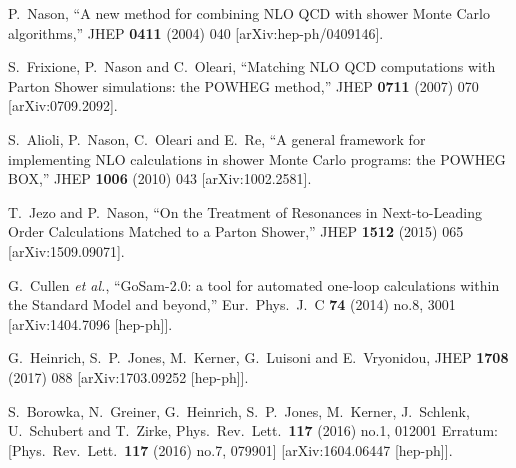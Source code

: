 \documentclass[paper]{JHEP3}
\begin{document}
\begin{thebibliography}{10}

  P.~Nason,
  ``A new method for combining NLO QCD with shower Monte Carlo algorithms,''
  JHEP {\bf 0411} (2004) 040
  [arXiv:hep-ph/0409146].

  S.~Frixione, P.~Nason and C.~Oleari,
  ``Matching NLO QCD computations with Parton Shower simulations: the POWHEG method,''
  JHEP {\bf 0711} (2007) 070
  [arXiv:0709.2092].

  S.~Alioli, P.~Nason, C.~Oleari and E.~Re,
  ``A general framework for implementing NLO calculations in shower Monte Carlo programs: the POWHEG BOX,''
  JHEP {\bf 1006} (2010) 043
  [arXiv:1002.2581].

  T.~Jezo and P.~Nason,
  ``On the Treatment of Resonances in Next-to-Leading Order Calculations Matched to a Parton Shower,''
  JHEP {\bf 1512} (2015) 065
  [arXiv:1509.09071].

  

  G.~Cullen {\it et al.},
  ``GoSam-2.0: a tool for automated one-loop calculations within the Standard Model and beyond,''
  Eur.\ Phys.\ J.\ C {\bf 74} (2014) no.8,  3001
  [arXiv:1404.7096 [hep-ph]].

  G.~Heinrich, S.~P.~Jones, M.~Kerner, G.~Luisoni and E.~Vryonidou,
  JHEP {\bf 1708} (2017) 088
  [arXiv:1703.09252 [hep-ph]].

  S.~Borowka, N.~Greiner, G.~Heinrich, S.~P.~Jones, M.~Kerner, J.~Schlenk, U.~Schubert and T.~Zirke,
  Phys.\ Rev.\ Lett.\  {\bf 117} (2016) no.1,  012001
   Erratum: [Phys.\ Rev.\ Lett.\  {\bf 117} (2016) no.7,  079901]
  [arXiv:1604.06447 [hep-ph]].


\end{thebibliography}
\end{document}
